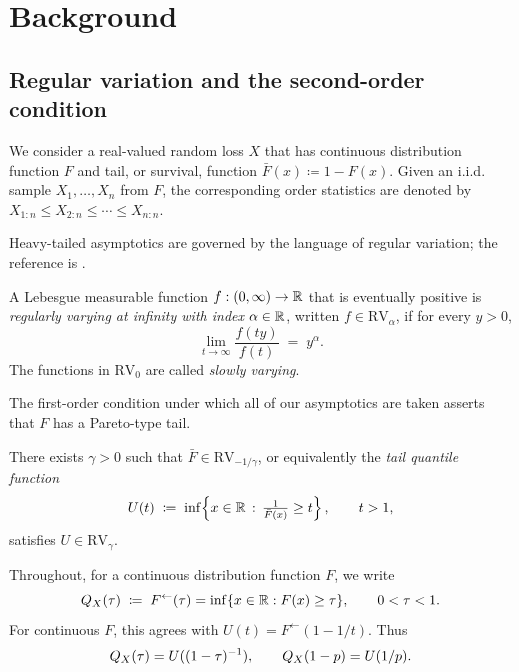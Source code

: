 \chapter{Background}
\label{ch:background}

\section{Regular variation and the second-order condition}
\label{sec:bg:rv}

We consider a real-valued random loss $X$ that
has continuous distribution function $F$ and tail, or survival, function
$\bar F(x) \coloneqq 1 - F(x)$. Given an i.i.d. sample
$X_{1}, \ldots, X_{n}$ from
$F$, the corresponding order statistics are denoted by
$X_{1:n} \le X_{2:n} \le \cdots \le X_{n:n}$.

Heavy-tailed asymptotics are governed by the language of regular
variation; the reference is \textcite[Appendix~B.1]{deHaanFerreira2006}.

\begin{definition}
\label{def:bg:rv}
A Lebesgue measurable function $f : (0,\infty) \to \mathbb{R}$ that is eventually
positive is \emph{regularly varying at infinity with index} $\alpha \in \mathbb{R}$, written
$f \in \mathrm{RV}_{\alpha}$, if for every $y > 0$,
\[
  \lim_{t \to \infty} \frac{f(t y)}{f(t)} \;=\; y^{\alpha}.
\]
The functions in $\mathrm{RV}_{0}$ are called \emph{slowly varying}.
\end{definition}

The first-order condition under which all of our asymptotics are taken
asserts that $F$ has a Pareto-type tail.

\begin{condition}
\label{cond:bg:first-order}
There exists $\gamma > 0$ such that
$\bar F \in \mathrm{RV}_{-1/\gamma}$, or equivalently the
\emph{tail quantile function}
\[
  U(t) \;\coloneqq\; \inf\!\Big\{ x \in \mathbb{R} \,:\, \tfrac{1}{\bar F(x)} \ge t \Big\}
  \,,\qquad t>1,
\]
satisfies $U \in \mathrm{RV}_{\gamma}$.
\end{condition}

Throughout, for a continuous distribution function $F$, we write
\[
  Q_X(\tau)
  \;\coloneqq\;
  F^{\leftarrow}(\tau)
  =
  \inf\{x\in\mathbb{R}:F(x)\ge \tau\},
  \qquad 0<\tau<1.
\]
For continuous \(F\), this agrees with \(U(t)=F^\leftarrow(1-1/t)\). Thus
\[
  Q_X(\tau)=U((1-\tau)^{-1}),
  \qquad
  Q_X(1-p)=U(1/p).
\]

